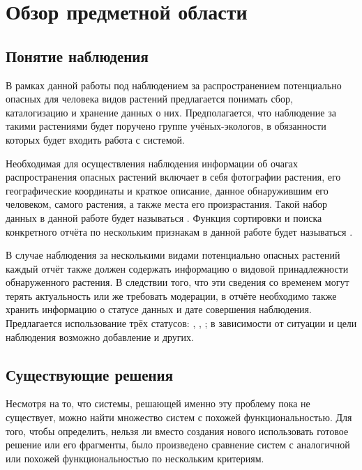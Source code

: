 
\section{Обзор предметной области}

\subsection{Понятие наблюдения}

\tab
В рамках данной работы под наблюдением за распространением потенциально опасных для человека видов растений предлагается понимать сбор, каталогизацию и хранение данных о них.
Предполагается, что наблюдение за такими растениями будет поручено группе учёных-экологов, в обязанности которых будет входить работа с системой.

\nwln
Необходимая для осуществления наблюдения информации об очагах распространения опасных растений включает в себя фотографии растения, его географические координаты и краткое описание, данное обнаружившим его человеком, самого растения, а также места его произрастания.
Такой набор данных в данной работе будет называться .
Функция сортировки и поиска конкретного отчёта по нескольким признакам в данной работе будет называться .

\nwln
В случае наблюдения за несколькими видами потенциально опасных растений каждый отчёт также должен содержать информацию о видовой принадлежности обнаруженного растения.
В следствии того, что эти сведения со временем могут терять актуальность или же требовать модерации, в отчёте необходимо также хранить информацию о статусе данных и дате совершения наблюдения.
Предлагается использование трёх статусов: , , ; в зависимости от ситуации и цели наблюдения возможно добавление и других. \\

\subsection{Существующие решения}

\tab
Несмотря на то, что системы, решающей именно эту проблему пока не существует, можно найти множество систем с похожей функциональностью.
Для того, чтобы определить, нельзя ли вместо создания нового использовать готовое решение или его фрагменты, было произведено сравнение систем с аналогичной или похожей функциональностью по нескольким критериям.

